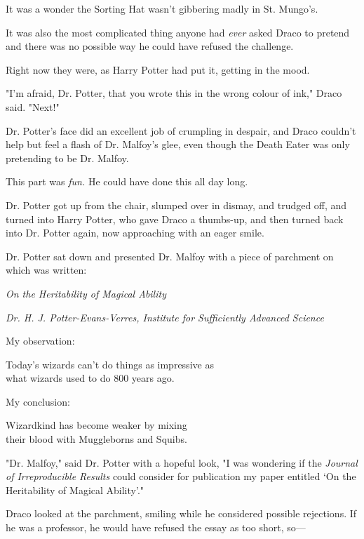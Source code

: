 It was a wonder the Sorting Hat wasn't gibbering madly in St. Mungo's.

It was also the most complicated thing anyone had \emph{ever} asked Draco to
pretend and there was no possible way he could have refused the challenge.

Right now they were, as Harry Potter had put it, getting in the mood.

"I'm afraid, Dr. Potter, that you wrote this in the wrong colour of ink," Draco
said. "Next!"

Dr. Potter's face did an excellent job of crumpling in despair, and Draco
couldn't help but feel a flash of Dr. Malfoy's glee, even though the Death
Eater was only pretending to be Dr. Malfoy.

This part was \emph{fun.} He could have done this all day long.

Dr. Potter got up from the chair, slumped over in dismay, and trudged off, and
turned into Harry Potter, who gave Draco a thumbs-up, and then turned back into
Dr. Potter again, now approaching with an eager smile.

Dr. Potter sat down and presented Dr. Malfoy with a piece of parchment on which
was written:

\begin{center}
\emph{On the Heritability of Magical Ability}

\emph{Dr. H. J. Potter-Evans-Verres, Institute for Sufficiently Advanced
Science}
\end{center}

\begin{writtenNote}
My observation:

Today's wizards can't do things as impressive as\\
what wizards used to do 800 years ago.

My conclusion:

Wizardkind has become weaker by mixing\\
their blood with Muggleborns and Squibs.
\end{writtenNote}

"Dr. Malfoy," said Dr. Potter with a hopeful look, "I was wondering if the
\emph{Journal of Irreproducible Results} could consider for publication my
paper entitled `On the Heritability of Magical Ability'."

Draco looked at the parchment, smiling while he considered possible rejections.
If he was a professor, he would have refused the essay as too short, so---

